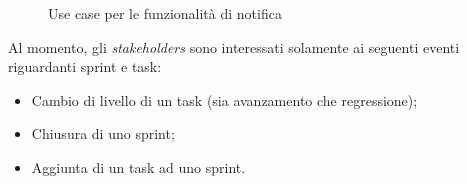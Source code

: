 \begin{figure}[H]
  \vspace*{\fill}
  \caption{Use case per le funzionalità di notifica}
  \label{fig:uc-notif}
\end{figure}

Al momento, gli \emph{stakeholders} sono interessati solamente ai seguenti
eventi riguardanti sprint e task:

\begin{itemize}
\item Cambio di livello di un task (sia avanzamento che regressione);
\item Chiusura di uno sprint;
\item Aggiunta di un task ad uno sprint.
\end{itemize}

